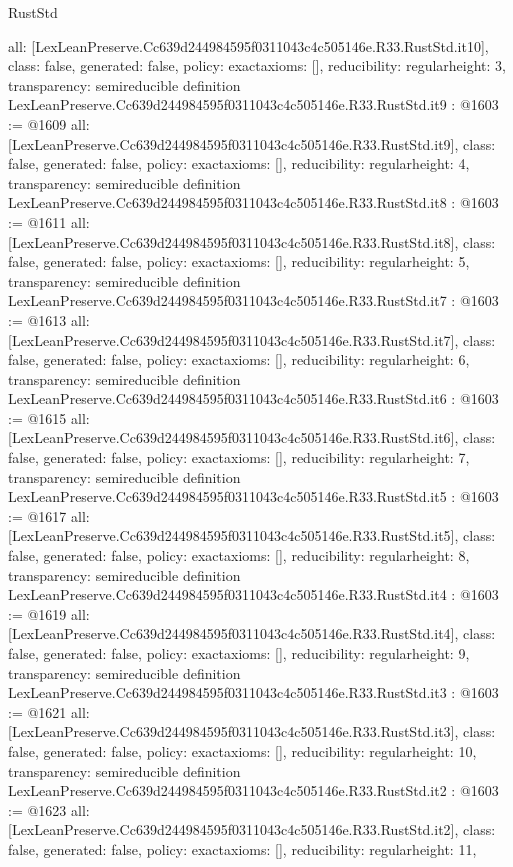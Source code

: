 \begin{lexlean}{RustStd}
\begin{coremodule}
{  all: [LexLeanPreserve.Cc639d244984595f0311043c4c505146e.R33.RustStd.it10],
  class: false,
  generated: false,
  policy: exact{axioms: []},
  reducibility: regular{height: 3},
  transparency: semireducible
}
definition LexLeanPreserve.Cc639d244984595f0311043c4c505146e.R33.RustStd.it9 : @1603 := @1609 {
  all: [LexLeanPreserve.Cc639d244984595f0311043c4c505146e.R33.RustStd.it9],
  class: false,
  generated: false,
  policy: exact{axioms: []},
  reducibility: regular{height: 4},
  transparency: semireducible
}
definition LexLeanPreserve.Cc639d244984595f0311043c4c505146e.R33.RustStd.it8 : @1603 := @1611 {
  all: [LexLeanPreserve.Cc639d244984595f0311043c4c505146e.R33.RustStd.it8],
  class: false,
  generated: false,
  policy: exact{axioms: []},
  reducibility: regular{height: 5},
  transparency: semireducible
}
definition LexLeanPreserve.Cc639d244984595f0311043c4c505146e.R33.RustStd.it7 : @1603 := @1613 {
  all: [LexLeanPreserve.Cc639d244984595f0311043c4c505146e.R33.RustStd.it7],
  class: false,
  generated: false,
  policy: exact{axioms: []},
  reducibility: regular{height: 6},
  transparency: semireducible
}
definition LexLeanPreserve.Cc639d244984595f0311043c4c505146e.R33.RustStd.it6 : @1603 := @1615 {
  all: [LexLeanPreserve.Cc639d244984595f0311043c4c505146e.R33.RustStd.it6],
  class: false,
  generated: false,
  policy: exact{axioms: []},
  reducibility: regular{height: 7},
  transparency: semireducible
}
definition LexLeanPreserve.Cc639d244984595f0311043c4c505146e.R33.RustStd.it5 : @1603 := @1617 {
  all: [LexLeanPreserve.Cc639d244984595f0311043c4c505146e.R33.RustStd.it5],
  class: false,
  generated: false,
  policy: exact{axioms: []},
  reducibility: regular{height: 8},
  transparency: semireducible
}
definition LexLeanPreserve.Cc639d244984595f0311043c4c505146e.R33.RustStd.it4 : @1603 := @1619 {
  all: [LexLeanPreserve.Cc639d244984595f0311043c4c505146e.R33.RustStd.it4],
  class: false,
  generated: false,
  policy: exact{axioms: []},
  reducibility: regular{height: 9},
  transparency: semireducible
}
definition LexLeanPreserve.Cc639d244984595f0311043c4c505146e.R33.RustStd.it3 : @1603 := @1621 {
  all: [LexLeanPreserve.Cc639d244984595f0311043c4c505146e.R33.RustStd.it3],
  class: false,
  generated: false,
  policy: exact{axioms: []},
  reducibility: regular{height: 10},
  transparency: semireducible
}
definition LexLeanPreserve.Cc639d244984595f0311043c4c505146e.R33.RustStd.it2 : @1603 := @1623 {
  all: [LexLeanPreserve.Cc639d244984595f0311043c4c505146e.R33.RustStd.it2],
  class: false,
  generated: false,
  policy: exact{axioms: []},
  reducibility: regular{height: 11},
}
\end{coremodule}
\end{lexlean}
